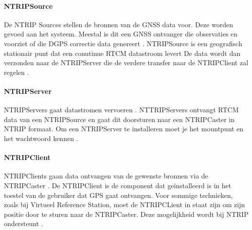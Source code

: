 \paragraph{NTRIPSource}
De NTRIP Sources stellen de bronnen van de GNSS data voor. Deze worden gevoed aan het systeem. Meestal is dit een GNSS ontvanger die observaties en voorziet of die DGPS correctie data genereert \cite{LBibNTRIP3}. NTRIPSource is een geografisch stationair punt dat een conutinue RTCM datastroom levert De data wordt dan verzonden naar de NTRIPServer die de verdere transfer naar de NTRIPClient zal regelen \cite{LBibNTRIP4}.

\paragraph{NTRIPServer}
NTRIPServers gaat datastromen vervoeren \cite{LBibGPS}. NTTRIPServers ontvangt RTCM data van een NTRIPSource en gaat dit doorsturen naar een NTRIPCaster in NTRIP formaat. Om een NTRIPServer te installeren moet je het mountpunt en het wachtwoord kennen \cite{LBibNTRIP4}.
 
\paragraph{NTRIPClient}
NTRIPClients gaan data ontvangen van de gewenste bronnen via de NTRIPCaster \cite{LBibNTRIP}. De NTRIPClient is de component dat ge\"installeerd is in het toestel van de gebruiker dat GPS gaat ontvangen. Voor sommige technieken, zoals bij Virtueel Reference Station,  moet de NTRIPCLient in staat zijn om zijn positie door te sturen naar de NTRIPCaster. Deze mogelijkheid wordt bij NTRIP ondersteunt \cite{LBibNTRIP4}.



